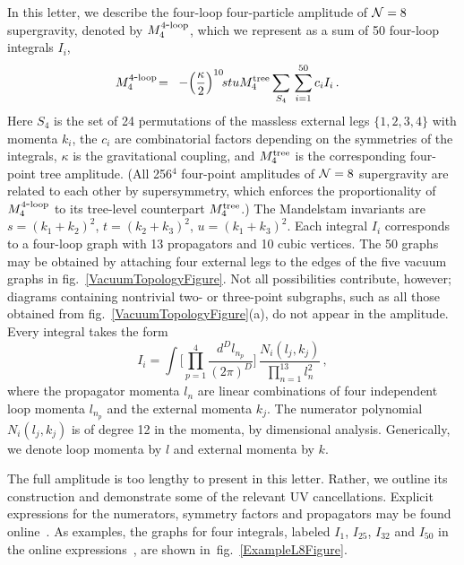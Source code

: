 \documentclass[aps,prl,twocolumn,groupedaddress,draft,showpacs,nofootinbib]{revtex4}
\def\fig#1{fig.~{\ref{#1}}}
\def\tree{{\rm tree}}
\def\NeqEight{{{\cal N}=8}}
\def\tree{{\rm tree}}
\def\fourloop{{\rm 4\hbox{-}loop}}
\begin{document}
In this letter, we describe the four-loop four-particle amplitude of 
$\NeqEight$ supergravity, denoted by $M_4^\fourloop$, 
which we represent as a sum of 50 four-loop integrals $I_i$,
%
\begin{eqnarray}
M_4^{\fourloop} \! & = & \! -\Bigl({\kappa \over 2}\Bigr)^{10}
  \! s t u M_4^\tree  \sum_{S_4}\,
\sum_{i=1}^{50} c_i  I_i \,.  \hskip .3 cm 
\label{FourLoopAmplitude}
\end{eqnarray}
%
Here $S_4$ is the set of 24 permutations of the massless external legs
$\{1,2,3,4\}$ with momenta $k_i$, the $c_i$ are combinatorial 
factors depending on the symmetries of the integrals, 
$\kappa$ is the gravitational coupling, 
and $M_4^\tree$ is the corresponding four-point tree
amplitude.  (All 256$^4$ four-point amplitudes of $\NeqEight$ 
supergravity are related to each other by supersymmetry, which
enforces the proportionality of $M_4^{\fourloop}$ to its tree-level
counterpart $M_4^\tree$.)  
The Mandelstam invariants are $s = (k_1 + k_2)^2$,
$t=(k_2+k_3)^2$, $u=(k_1+k_3)^2$.  Each integral $I_i$ corresponds to
a four-loop graph with 13 propagators and 10 cubic vertices. 
%
The 50 graphs may be obtained by attaching four
external legs to the edges of the five vacuum graphs in
\fig{VacuumTopologyFigure}. Not all possibilities contribute, however;
diagrams containing nontrivial two- or three-point
subgraphs, such as all those obtained from
\fig{VacuumTopologyFigure}(a), do not appear in the amplitude.
Every integral takes the form
%
\begin{equation}
I_i = \int  \Biggl[ \prod_{p=1}^4 \frac{d^D l_{n_p}}{(2\pi)^D} \Biggr] \, 
 \frac{N_i (l_j, k_j)} {\prod_{n=1}^{13} l_n^2} \,,
\label{IntegralNormalization}
\end{equation}
%
where the propagator momenta $l_n$ are linear combinations of
four independent loop momenta $l_{n_p}$ and the
external momenta $k_j$.
The numerator polynomial
$N_i(l_j, k_j)$ is of degree 12 in the momenta, by dimensional
analysis.  Generically, we denote loop momenta by $l$ and external momenta
by $k$.

The full amplitude is too lengthy to present in this letter.  Rather,
we outline its construction and demonstrate some of the relevant UV
cancellations.  Explicit expressions for the numerators, symmetry
factors and propagators may be found online~\cite{WebResult}.  As
examples, the graphs for four integrals, labeled $I_1$, $I_{25}$,
$I_{32}$ and $I_{50}$ in the online expressions~\cite{WebResult}, are
shown in~\fig{ExampleL8Figure}.
\end{document}
